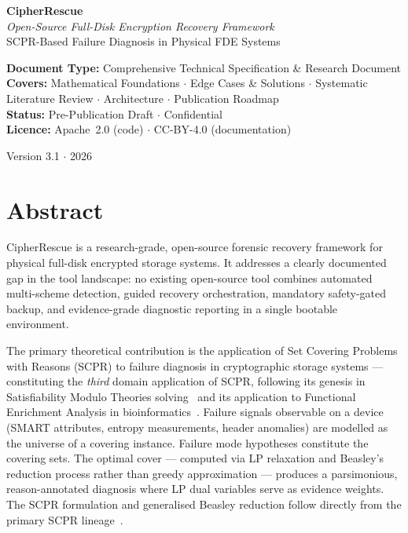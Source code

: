 \documentclass[11pt,a4paper]{report}
\begin{document}
\begin{titlepage}
\centering
\vspace*{2cm}
{\Huge\bfseries\color{navyblue} CipherRescue}\\[0.5cm]
{\Large\color{royalblue}\itshape Open-Source Full-Disk Encryption Recovery Framework}\\[0.3cm]
{\large\color{darkgrey} SCPR-Based Failure Diagnosis in Physical FDE Systems}\\[2cm]

\begin{tcolorbox}[enhanced, colback=lightblue!30, colframe=royalblue, arc=6pt, width=0.85\textwidth]
\centering\small
\textbf{Document Type:} Comprehensive Technical Specification \& Research Document\\[4pt]
\textbf{Covers:} Mathematical Foundations $\cdot$ Edge Cases \& Solutions $\cdot$ Systematic Literature Review $\cdot$ Architecture $\cdot$ Publication Roadmap\\[4pt]
\textbf{Status:} Pre-Publication Draft $\cdot$ Confidential\\[4pt]
\textbf{Licence:} Apache~2.0 (code) $\cdot$ CC-BY-4.0 (documentation)
\end{tcolorbox}

\vfill
{\small\color{midgrey} Version 3.1 $\cdot$ 2026}
\end{titlepage}

\chapter*{Abstract}

CipherRescue is a research-grade, open-source forensic recovery framework for physical full-disk encrypted storage systems. It addresses a clearly documented gap in the tool landscape: no existing open-source tool combines automated multi-scheme detection, guided recovery orchestration, mandatory safety-gated backup, and evidence-grade diagnostic reporting in a single bootable environment.

The primary theoretical contribution is the application of Set Covering Problems with Reasons (SCPR) to failure diagnosis in cryptographic storage systems --- constituting the \emph{third} domain application of SCPR, following its genesis in Satisfiability Modulo Theories solving~\cite{sadeghimanesh2022smt} and its application to Functional Enrichment Analysis in bioinformatics~\cite{babatunde2025thesis}. Failure signals observable on a device (SMART attributes, entropy measurements, header anomalies) are modelled as the universe of a covering instance. Failure mode hypotheses constitute the covering sets. The optimal cover --- computed via LP relaxation and Beasley's reduction process rather than greedy approximation --- produces a parsimonious, reason-annotated diagnosis where LP dual variables serve as evidence weights. The SCPR formulation and generalised Beasley reduction follow directly from the primary SCPR lineage~\cite{babatunde2025thesis}.
\end{document}
